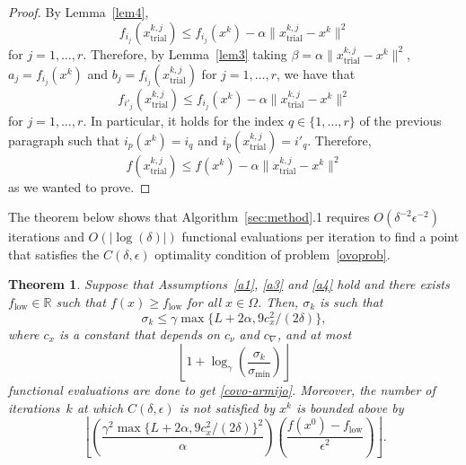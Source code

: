 \documentclass[11pt]{article}
\newcommand{\R}{\mathbb{R}}
\newcommand{\xkjtrial}{x^{k,j}_{\mathrm{trial}}}
\newcommand{\flow}{f_{\mathrm{low}}}
\newtheorem{theorem}{Theorem}[section]
\begin{document}
\begin{proof}
By Lemma~\ref{lem4}, 
\[
f_{i_j}(\xkjtrial) \leq f_{i_j}(x^k) - \alpha \|\xkjtrial - x^k\|^2
\]
for $j=1,\dots,r$. Therefore, by Lemma~\ref{lem3} taking $\beta = \alpha \|\xkjtrial - x^k\|^2$, $a_j = f_{i_j}(x^k)$ and $b_j=f_{i_j}(\xkjtrial)$ for $j=1,\dots,r$, we have that
\[
f_{i'_j}(\xkjtrial) \leq f_{i_j}(x^k) - \alpha \|\xkjtrial - x^k\|^2
\]
for $j=1,\dots,r$. In particular, it holds for the index $q \in \{1,\dots,r\}$ of the previous paragraph such that $i_p(x^k)=i_q$ and $i_p(\xkjtrial)=i'_q$. Therefore,
\[
f(\xkjtrial) \leq f(x^k) - \alpha \|\xkjtrial - x^k\|^2
\]
as we wanted to prove.
\end{proof}

The theorem below shows that Algorithm~\ref{sec:method}.1 requires $O(\delta^{-2} \epsilon^{-2})$ iterations and $O(|\log(\delta)|)$ functional evaluations per iteration to find a point that satisfies the $C(\delta,\epsilon)$ optimality condition of problem~\eqref{ovoprob}.

\begin{theorem} \label{teo6}
Suppose that Assumptions~\ref{a1}, \ref{a3} and \ref{a4} hold and there exists $\flow \in \R$ such that $f(x) \geq \flow$ for all $x \in \Omega$. Then, $\sigma_k$ is such that
\begin{equation}\label{cotasigma}
\sigma_k \leq \gamma \max \{ L + 2\alpha, 9 c_x^2/(2\delta) \},
\end{equation}
where $c_x$ is a constant that depends on $c_{\nu}$ and $c_{\nabla}$, and at most
\begin{equation}\label{atmost} 
\left\lfloor 1 + \log_{\gamma} \left(\dfrac{\sigma_k}{\sigma_{\min}}\right)\right\rfloor
\end{equation}
functional evaluations are done to get \eqref{covo-armijo}. Moreover, the number of iterations~$k$ at which $C(\delta,\epsilon)$ is not satisfied by $x^k$ is bounded above by
\begin{equation}\label{cvar-order-box} 
\left\lfloor\left( \dfrac{\gamma^2 \max\{ L + 2\alpha,  9 c_x^2 / ( 2\delta)\}^2}{\alpha} \right)\left( \dfrac{f(x^0)-\flow}{\epsilon^2}\right)\right\rfloor.
\end{equation}
\end{theorem}
\end{document}
